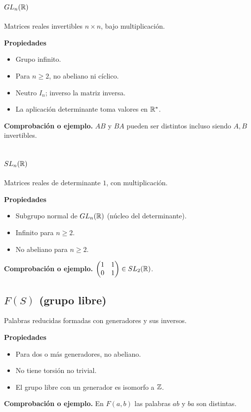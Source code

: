 \documentclass[11pt,a4paper]{article}
\begin{document}
\subsection{$GL_n(\mathbb{R})$}
\begin{ejemplo}
Matrices reales invertibles $n\times n$, bajo multiplicación.
\end{ejemplo}
\textbf{Propiedades}
\begin{itemize}
\item Grupo infinito.
\item Para $n\ge2$, no abeliano ni cíclico.
\item Neutro $I_n$; inverso la matriz inversa.
\item La aplicación determinante toma valores en $\mathbb{R}^*$.
\end{itemize}
\textbf{Comprobación o ejemplo.} $AB$ y $BA$ pueden ser distintos incluso siendo $A,B$ invertibles.

\subsection{$SL_n(\mathbb{R})$}
\begin{ejemplo}
Matrices reales de determinante $1$, con multiplicación.
\end{ejemplo}
\textbf{Propiedades}
\begin{itemize}
\item Subgrupo normal de $GL_n(\mathbb{R})$ (núcleo del determinante).
\item Infinito para $n\ge2$.
\item No abeliano para $n\ge2$.
\end{itemize}
\textbf{Comprobación o ejemplo.} $\begin{pmatrix}1&1\\0&1\end{pmatrix}\in SL_2(\mathbb{R})$.

\subsection{$F(S)$ (grupo libre)}
\begin{ejemplo}
Palabras reducidas formadas con generadores y sus inversos.
\end{ejemplo}
\textbf{Propiedades}
\begin{itemize}
\item Para dos o más generadores, no abeliano.
\item No tiene torsión no trivial.
\item El grupo libre con un generador es isomorfo a $\mathbb{Z}$.
\end{itemize}
\textbf{Comprobación o ejemplo.} En $F(a,b)$ las palabras $ab$ y $ba$ son distintas.
\end{document}
